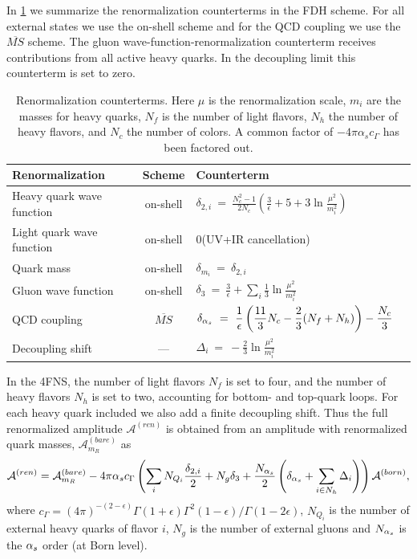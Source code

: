 In \cref{tab:renorm} we summarize the renormalization counterterms
in the FDH scheme. For all external states we use the on-shell
scheme and for the QCD coupling we use the $\overline{MS}$ scheme. The gluon
wave-function-renormalization counterterm receives contributions from all
active heavy quarks. In the decoupling limit this counterterm is set to
zero.
\begin{table}[h]
  \begin{tabular}{lcll}
    \textbf{Renormalization} & \textbf{Scheme} & \textbf{Counterterm} \\
    \toprule
    Heavy quark wave function   & on-shell & $\displaystyle \delta_{2,i} ~=~ \frac{N_c^2-1}{2N_c} \left( \frac{3}{\epsilon} + 5 + 3 \ln{\frac{\mu^2}{m_i^2}} \right)$\\
    Light quark wave function   & on-shell & 0\qquad(UV+IR cancellation) \\
    Quark mass            & on-shell & $\displaystyle \delta_{m_i} ~=~ \delta_{2,i}\quad\text{}$\\
    Gluon wave function   & on-shell & $\displaystyle \delta_3 ~=~ \frac{3}{\epsilon} + \sum_i \frac{1}{3}\ln{\frac{\mu^2}{m_i^2}}$\\
    QCD coupling & $\overline{MS}$ & $\displaystyle \delta_{\alpha_s} ~=~ \frac{1}{\epsilon} \left( \frac{11}{3}N_c - \frac{2}{3}(N_f+N_h) \right) - \frac{N_c}{3}$\\
    \midrule
    Decoupling shift & --- & $\displaystyle     \Delta_i ~=~  -\frac{2}{3}\ln{\frac{\mu^2}{m_i^2}} $\\
    \bottomrule
  \end{tabular}
  \caption{Renormalization counterterms. Here $\mu$ is the renormalization
    scale, $m_{i}$ are the masses for heavy quarks, $N_f$ is the number of light flavors,
    $N_h$ the number of heavy flavors, and $N_c$ the number of colors.
    A common factor of $-4\pi\alpha_s c_\Gamma$ has been factored out.
  }
  \label{tab:renorm}
\end{table}
In the 4FNS, the number of light flavors $N_f$ is set to four, and the
number of heavy flavors $N_h$ is set to two, accounting for bottom-
and top-quark loops. For each heavy quark included we also add a finite
decoupling shift. Thus the full renormalized amplitude $\mathcal{A}^{(ren)}$ is
obtained from an amplitude with renormalized quark masses, $\mathcal{A}^{(bare)}_{m_R}$ as
%
\begin{equation}
  \mathcal{A}^{(ren)} =
  \mathcal{A}^{(bare)}_{m_R} - 4\pi \alpha_s c_\Gamma 
  \left( \sum_i N_{Q_i} \frac{\delta_{2,i}}{2} + N_{g}\delta_3 + \frac{N_{\alpha_s}}{2}\left(\delta_{\alpha_s} + \sum_{i\in N_h}\Delta_i\right) \right)  \mathcal{A}^{(born)},
  \label{renfull}
\end{equation}
%
where $\displaystyle c_\Gamma={(4\pi)^{-(2-\epsilon)}{\Gamma(1+\epsilon)\Gamma^2(1-\epsilon)}/\Gamma(1-2\epsilon)}$,
$N_{Q_i}$ is the number of external heavy quarks of flavor $i$, $N_g$ is the number of external
gluons and $N_{\alpha_s}$ is the $\alpha_s$ order (at Born level).

